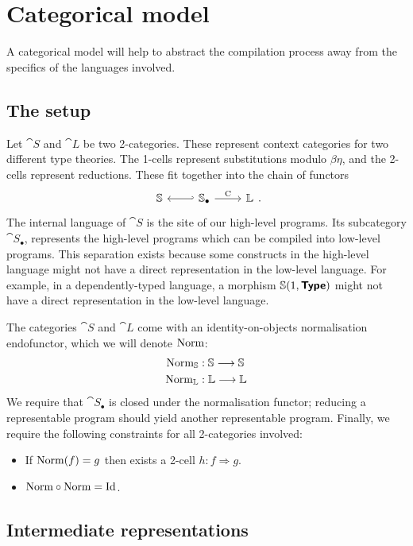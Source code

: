 \section{Categorical model}\label{sec:model}

A categorical model will help to abstract the compilation process away from the
specifics of the languages involved.

\subsection{The setup}

Let $\cat S$ and $\cat L$ be two 2-categories. These represent context
categories for two different type theories. The 1-cells represent substitutions
modulo $\beta \eta$, and the 2-cells represent reductions. These fit together
into the chain of functors $$
  \begin{tikzcd}
    \cat S & \arrow[l, hook'] \cat S_{\bullet} \arrow[r, "\fun{C}"] & \cat L
  \end{tikzcd} .
$$
The internal language of $\cat S$ is the site of our high-level programs. Its
subcategory $\cat S_{\bullet}$, represents the high-level programs which can be
compiled into low-level programs. This separation exists because some
constructs in the high-level language might not have a direct representation in
the low-level language. For example, in a dependently-typed language, a
morphism $\mathbb S(1, \textsf{\textbf{Type}})$ might not have a direct representation in the
low-level language.

The categories $\cat S$ and $\cat L$ come with an identity-on-objects
normalisation endofunctor, which we will denote $\mathrm{Norm}$:
\begin{align*}
  \mathrm{Norm}_{\mathbb S} & : \mathbb S \longrightarrow \mathbb S \\
  \mathrm{Norm}_{\mathbb L} & : \mathbb L \longrightarrow \mathbb L
\end{align*}
We require that $\cat S_{\bullet}$ is closed under the normalisation functor;
reducing a representable program should yield another representable program.
Finally, we require the following constraints for all 2-categories involved:
\begin{itemize}
  \item If $\mathrm{Norm} (f) = g$ then exists a 2-cell $h : f \Rightarrow g$.
  \item $\mathrm{Norm} \circ \mathrm{Norm} = \mathrm{Id}$.
\end{itemize}

\subsection{Intermediate representations}

